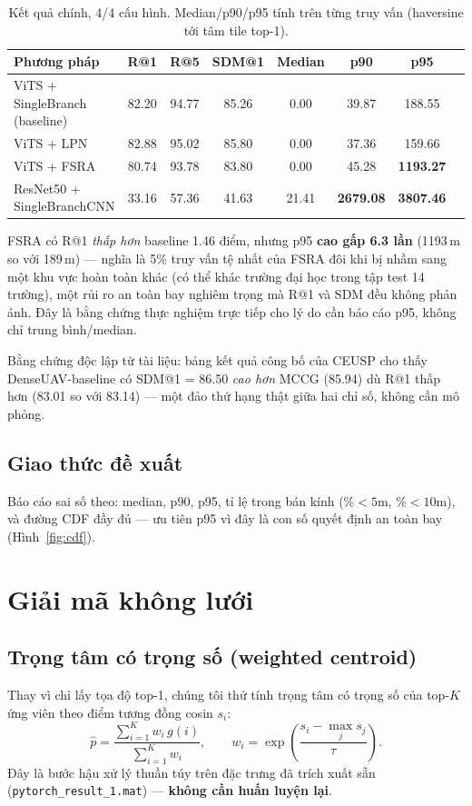 \documentclass[11pt]{article}
\begin{document}
\begin{table}[h]
\centering
\caption{Kết quả chính, 4/4 cấu hình. Median/p90/p95 tính trên từng truy vấn (haversine tới tâm tile top-1).}
\label{tab:main}
\begin{tabular}{lccccccc}
\toprule
Phương pháp & R@1 & R@5 & SDM@1 & Median & p90 & p95 \\
\midrule
ViTS + SingleBranch (baseline) & 82.20 & 94.77 & 85.26 & 0.00 & 39.87 & 188.55 \\
ViTS + LPN                     & 82.88 & 95.02 & 85.80 & 0.00 & 37.36 & 159.66 \\
ViTS + FSRA                    & 80.74 & 93.78 & 83.80 & 0.00 & 45.28 & \textbf{1193.27} \\
ResNet50 + SingleBranchCNN     & 33.16 & 57.36 & 41.63 & 21.41 & \textbf{2679.08} & \textbf{3807.46} \\
\bottomrule
\end{tabular}
\end{table}

FSRA có R@1 \emph{thấp hơn} baseline 1.46 điểm, nhưng p95 \textbf{cao gấp 6.3 lần} (1193\,m so với 189\,m) — nghĩa là 5\% truy vấn tệ nhất của FSRA đôi khi bị nhầm sang một khu vực hoàn toàn khác (có thể khác trường đại học trong tập test 14 trường), một rủi ro an toàn bay nghiêm trọng mà R@1 và SDM đều không phản ánh. Đây là bằng chứng thực nghiệm trực tiếp cho lý do cần báo cáo p95, không chỉ trung bình/median.

Bằng chứng độc lập từ tài liệu: bảng kết quả công bố của CEUSP \cite{ceusp} cho thấy DenseUAV-baseline có SDM@1 = 86.50 \emph{cao hơn} MCCG (85.94) dù R@1 thấp hơn (83.01 so với 83.14) — một đảo thứ hạng thật giữa hai chỉ số, không cần mô phỏng.

\subsection{Giao thức đề xuất}
Báo cáo sai số theo: median, p90, p95, tỉ lệ trong bán kính (\%$<5$m, \%$<10$m), và đường CDF đầy đủ — ưu tiên p95 vì đây là con số quyết định an toàn bay (Hình~\ref{fig:cdf}).

\section{Giải mã không lưới}

\subsection{Trọng tâm có trọng số (weighted centroid)}
Thay vì chỉ lấy tọa độ top-1, chúng tôi thử tính trọng tâm có trọng số của top-$K$ ứng viên theo điểm tương đồng cosin $s_i$:
$$
\hat p = \frac{\sum_{i=1}^{K} w_i\, g(i)}{\sum_{i=1}^{K} w_i}, \qquad w_i = \exp\!\left(\frac{s_i - \max_j s_j}{\tau}\right).
$$
Đây là bước hậu xử lý thuần túy trên đặc trưng đã trích xuất sẵn (\texttt{pytorch\_result\_1.mat}) — \textbf{không cần huấn luyện lại}.
\end{document}
